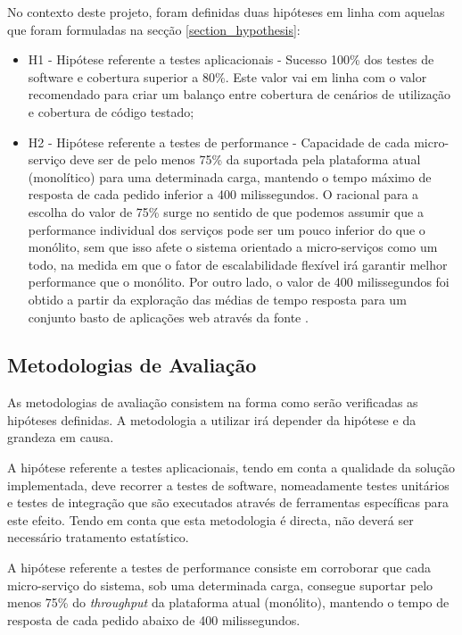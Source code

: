 No contexto deste projeto, foram definidas duas hipóteses em linha com aquelas que foram formuladas na secção \ref{section_hypothesis}:
\begin{itemize}
    \item H1 - Hipótese referente a testes aplicacionais - Sucesso 100\% dos testes de software e cobertura superior a 80\%. Este valor vai em linha com o valor recomendado para criar um balanço entre cobertura de cenários de utilização e cobertura de código testado\cite{code_coverage};
    \item H2 - Hipótese referente a testes de performance - Capacidade de cada micro-serviço deve ser de pelo menos 75\% da suportada pela plataforma atual (monolítico) para uma determinada carga, mantendo o tempo máximo de resposta de cada pedido inferior a 400 milissegundos.
    O racional para a escolha do valor de 75\% surge no sentido de que podemos assumir que a performance individual dos serviços pode ser um pouco inferior do que o monólito, sem que isso afete o sistema orientado a micro-serviços como um todo, na medida em que o fator de escalabilidade flexível irá garantir melhor performance que o monólito.
    Por outro lado, o valor de 400 milissegundos foi obtido a partir da exploração das médias de tempo resposta para um conjunto basto de aplicações web através da fonte \cite{average_server_response_time}.
\end{itemize}

\subsection{Metodologias de Avaliação}
As metodologias de avaliação consistem na forma como serão verificadas as hipóteses definidas. A metodologia a utilizar irá depender da hipótese e da grandeza em causa.

A hipótese referente a testes aplicacionais, tendo em conta a qualidade da solução implementada, deve recorrer a testes de software, nomeadamente testes unitários e testes de integração que são executados através de ferramentas específicas para este efeito. Tendo em conta que esta metodologia é directa, não deverá ser necessário tratamento estatístico.

A hipótese referente a testes de performance consiste em corroborar que cada micro-serviço do sistema, sob uma determinada carga, consegue suportar pelo menos 75\% do \emph{throughput} da plataforma atual (monólito), mantendo o tempo de resposta de cada pedido abaixo de 400 milissegundos.

